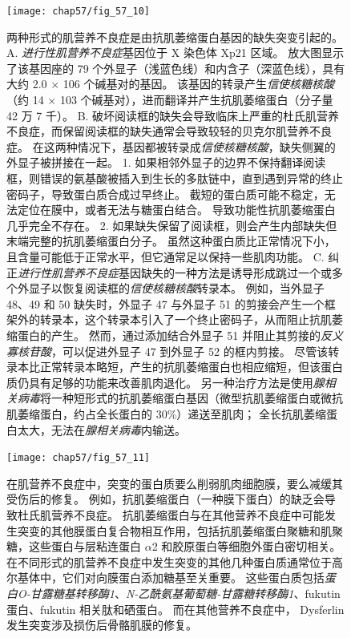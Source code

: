 \begin{figure}[htbp]
	\centering
	\texttt{[image: chap57/fig\_57\_10]}
	\caption{两种形式的肌营养不良症是由抗肌萎缩蛋白基因的缺失突变引起的\cite{hoffman1987dystrophin}。
		A. \textit{进行性肌营养不良症}基因位于 X 染色体 Xp21 区域。
		放大图显示了该基因座的 79 个外显子（浅蓝色线）和内含子（深蓝色线），具有大约 2.0 $\times$ 106 个碱基对的基因。
		该基因的转录产生\textit{信使核糖核酸}（约 14 $\times$ 103 个碱基对），进而翻译并产生抗肌萎缩蛋白（分子量 42 万 7 千）。
		B. 破坏阅读框的缺失会导致临床上严重的杜氏肌营养不良症，而保留阅读框的缺失通常会导致较轻的贝克尔肌营养不良症。
		在这两种情况下，基因都被转录成\textit{信使核糖核酸}，缺失侧翼的外显子被拼接在一起。
		1. 如果相邻外显子的边界不保持翻译阅读框，则错误的氨基酸被插入到生长的多肽链中，直到遇到异常的终止密码子，导致蛋白质合成过早终止。
		截短的蛋白质可能不稳定，无法定位在膜中，或者无法与糖蛋白结合。
		导致功能性抗肌萎缩蛋白几乎完全不存在。
		2. 如果缺失保留了阅读框，则会产生内部缺失但末端完整的抗肌萎缩蛋白分子。
		虽然这种蛋白质比正常情况下小，且含量可能低于正常水平，但它通常足以保持一些肌肉功能。
		C. 纠正\textit{进行性肌营养不良症}基因缺失的一种方法是诱导形成跳过一个或多个外显子以恢复阅读框的\textit{信使核糖核酸}转录本。
		例如，当外显子 48、49 和 50 缺失时，外显子 47 与外显子 51 的剪接会产生一个框架外的转录本，这个转录本引入了一个终止密码子，从而阻止抗肌萎缩蛋白的产生。
		然而，通过添加结合外显子 51 并阻止其剪接的\textit{反义寡核苷酸}，可以促进外显子 47 到外显子 52 的框内剪接。
		尽管该转录本比正常转录本略短，产生的抗肌萎缩蛋白也相应缩短，但该蛋白质仍具有足够的功能来改善肌肉退化。
		另一种治疗方法是使用\textit{腺相关病毒}将一种短形式的抗肌萎缩蛋白基因（微型抗肌萎缩蛋白或微抗肌萎缩蛋白，约占全长蛋白的 30\%）递送至肌肉；
		全长抗肌萎缩蛋白太大，无法在\textit{腺相关病毒}内输送。}
	\label{fig:57_10}
\end{figure}


\begin{figure}[htbp]
	\centering
	\texttt{[image: chap57/fig\_57\_11]}
	\caption{在肌营养不良症中，突变的蛋白质要么削弱肌肉细胞膜，要么减缓其受伤后的修复。
		例如，抗肌萎缩蛋白（一种膜下蛋白）的缺乏会导致杜氏肌营养不良症。
		抗肌萎缩蛋白与在其他营养不良症中可能发生突变的其他膜蛋白复合物相互作用，包括抗肌萎缩蛋白聚糖和肌聚糖，这些蛋白与层粘连蛋白 $\alpha$2 和胶原蛋白等细胞外蛋白密切相关。
		在不同形式的肌营养不良症中发生突变的其他几种蛋白质通常位于高尔基体中，它们对向膜蛋白添加糖基至关重要。
		这些蛋白质包括\textit{蛋白O-甘露糖基转移酶1}、\textit{N-乙酰氨基葡萄糖-甘露糖转移酶1}、fukutin蛋白、fukutin 相关肽和硒蛋白。
		而在其他营养不良症中， Dysferlin发生突变涉及损伤后骨骼肌膜的修复\cite{brown2005harrison}。}
	\label{fig:57_11}
\end{figure}


